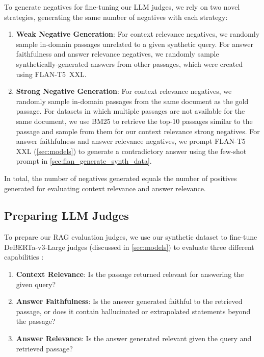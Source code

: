 To generate negatives for fine-tuning our LLM judges, we rely on two novel strategies, generating the same number of negatives with each strategy:


\begin{enumerate}\setlength{\itemsep}{0pt}
    \item \textbf{Weak Negative Generation}: For context relevance negatives, we randomly sample in-domain passages unrelated to a given synthetic query. 
    For answer faithfulness and answer relevance negatives, we randomly sample synthetically-generated answers from other passages, which were created using FLAN-T5~XXL.
    \item \textbf{Strong Negative Generation}: For context relevance negatives, we randomly sample in-domain passages from the same document as the gold passage.
    For datasets in which multiple passages are not available for the same document, we use BM25 to retrieve the top-10 passages similar to the passage and sample from them for our context relevance strong negatives.  
    For answer faithfulness and answer relevance negatives, we prompt FLAN-T5 XXL (\autoref{sec:models}) to generate a contradictory answer using the few-shot prompt in \autoref{sec:flan_generate_synth_data}.
\end{enumerate}

In total, the number of negatives generated equals the number of positives generated for evaluating context relevance and answer relevance. %

\subsection{Preparing LLM Judges}

To prepare our RAG evaluation judges, we use our synthetic dataset to fine-tune DeBERTa-v3-Large judges (discussed in  \autoref{sec:models}) %
to evaluate %
three different capabilities
\cite{chen2023benchmarking, ragas2023}:

\begin{enumerate}\setlength{\itemsep}{0pt}
    \item \textbf{Context Relevance}: Is the passage returned relevant for answering the given query?
    \item \textbf{Answer Faithfulness}: Is the answer generated faithful to the retrieved passage, or does it contain hallucinated or extrapolated statements beyond the passage?
    \item \textbf{Answer Relevance}: Is the answer generated relevant given the query and retrieved passage?
\end{enumerate}

